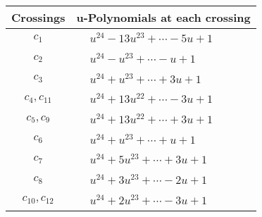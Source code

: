 \documentclass[1p]{elsarticle_modified}
\theoremstyle{definition}
\begin{document}
\begin{tabular}{m{50pt}|m{274pt}}
Crossings & \hspace{64pt}u-Polynomials at each crossing \\
\hline $$\begin{aligned}c_{1}\end{aligned}$$&$\begin{aligned}
&u^{24}-13 u^{23}+\cdots-5 u+1
\end{aligned}$\\
\hline $$\begin{aligned}c_{2}\end{aligned}$$&$\begin{aligned}
&u^{24}- u^{23}+\cdots- u+1
\end{aligned}$\\
\hline $$\begin{aligned}c_{3}\end{aligned}$$&$\begin{aligned}
&u^{24}+u^{23}+\cdots+3 u+1
\end{aligned}$\\
\hline $$\begin{aligned}c_{4},c_{11}\end{aligned}$$&$\begin{aligned}
&u^{24}+13 u^{22}+\cdots-3 u+1
\end{aligned}$\\
\hline $$\begin{aligned}c_{5},c_{9}\end{aligned}$$&$\begin{aligned}
&u^{24}+13 u^{22}+\cdots+3 u+1
\end{aligned}$\\
\hline $$\begin{aligned}c_{6}\end{aligned}$$&$\begin{aligned}
&u^{24}+u^{23}+\cdots+u+1
\end{aligned}$\\
\hline $$\begin{aligned}c_{7}\end{aligned}$$&$\begin{aligned}
&u^{24}+5 u^{23}+\cdots+3 u+1
\end{aligned}$\\
\hline $$\begin{aligned}c_{8}\end{aligned}$$&$\begin{aligned}
&u^{24}+3 u^{23}+\cdots-2 u+1
\end{aligned}$\\
\hline $$\begin{aligned}c_{10},c_{12}\end{aligned}$$&$\begin{aligned}
&u^{24}+2 u^{23}+\cdots-3 u+1
\end{aligned}$\\
\hline
\end{tabular}\\~\\
\end{document}

